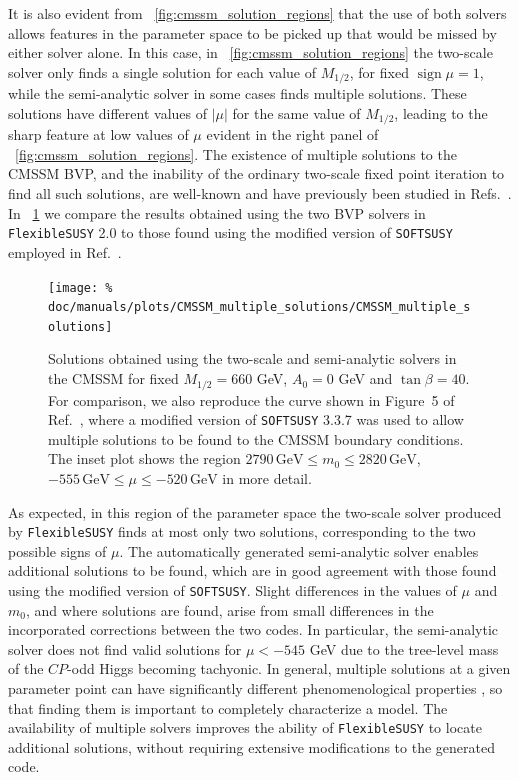 \documentclass[final,3p,11pt,pdflatex]{elsarticle}
\makeatletter
\newcommand{\fs}{\texttt{FlexibleSUSY}\@\xspace}
\newcommand{\softsusy}{\texttt{SOFTSUSY}\@\xspace}
\newcommand{\fstwo}{\fs 2.0\@\xspace}
\newcommand{\unit}[1]{\,\text{#1}}      %
\newcommand{\figref}[1]{\figurename~\ref{#1}}
\newcommand{\CP}{\ensuremath{CP}\xspace}
\newcommand{\azero}{\ensuremath{A_0}\xspace}
\newcommand{\mhalf}{\ensuremath{M_{1/2}}\xspace}
\newcommand{\mzero}{\ensuremath{m_0}\xspace}
\DeclareMathOperator{\sign}{sign}
\makeatother
\begin{document}
It is also evident from \figref{fig:cmssm_solution_regions} that the use of
both solvers allows features in the parameter space to be picked up that would
be missed by either solver alone.  In this case, in
\figref{fig:cmssm_solution_regions} the two-scale solver only finds a single
solution for each value of $\mhalf$, for fixed $\sign\mu = 1$, while the
semi-analytic solver in some cases finds multiple solutions.  These
solutions have different values of $|\mu|$ for the same value of $\mhalf$,
leading to the sharp feature at low values of $\mu$ evident in the right panel
of \figref{fig:cmssm_solution_regions}.  The existence of multiple solutions to
the CMSSM BVP, and the inability of the ordinary two-scale fixed point iteration
to find all such solutions, are well-known and have previously been studied in
Refs.~\cite{Allanach:2013cda,Allanach:2013yua}.  In
\figref{fig:cmssm_multiple_solutions} we compare the results obtained using
the two BVP solvers in \fstwo to those found using the modified version of
\softsusy employed in Ref.~\cite{Allanach:2013cda}.
%
\begin{figure}
  \centering
  \texttt{[image: \%
    doc/manuals/plots/CMSSM\_multiple\_solutions/CMSSM\_multiple\_solutions]}
  \caption{Solutions obtained using the two-scale and semi-analytic solvers
    in the CMSSM for fixed $\mhalf = 660$ GeV, $\azero = 0$ GeV and
    $\tan\beta = 40$.  For comparison, we also reproduce the curve shown in
    Figure~5 of Ref.~\cite{Allanach:2013cda}, where a modified version of
    \softsusy 3.3.7 was used to allow multiple solutions to be found to the
    CMSSM boundary conditions.  The inset plot shows the region $2790\unit{GeV}
    \leq \mzero \leq 2820\unit{GeV}$, $-555\unit{GeV} \leq \mu
    \leq -520\unit{GeV}$ in more detail.}
  \label{fig:cmssm_multiple_solutions}
\end{figure}
%
As expected, in this region of the parameter space the two-scale solver
produced by \fs finds at most only two solutions, corresponding to the two
possible signs of $\mu$.  The automatically generated semi-analytic solver
enables additional solutions to be found, which are in good agreement with
those found using the modified version of \softsusy.  Slight differences in
the values of $\mu$ and $\mzero$, and where solutions are found, arise from
small differences in the incorporated corrections between the two codes.  In
particular, the semi-analytic solver does not find valid solutions for
$\mu < -545$ GeV due to the tree-level mass of the \CP-odd Higgs becoming
tachyonic.  In general, multiple solutions at a given parameter point
can have significantly different phenomenological properties
\cite{Allanach:2013yua}, so that finding them is important to completely
characterize a model.  The availability of multiple solvers improves the
ability of \fs to locate additional solutions, without requiring extensive
modifications to the generated code.
\end{document}
